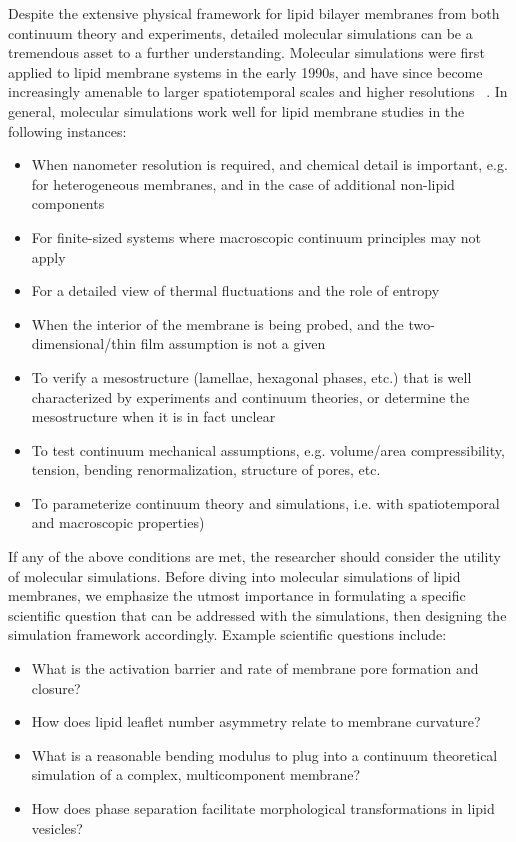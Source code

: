 \documentclass[9pt,bestpractices,pubversion]{livecoms}
\begin{document}
Despite the extensive physical framework for lipid bilayer membranes from both continuum theory and experiments, detailed molecular simulations can be a tremendous asset to a further understanding.
Molecular simulations were first applied to lipid membrane systems in the early 1990s, and have since become increasingly amenable to larger spatiotemporal scales and higher resolutions ~\cite{Venable2015}.
In general, molecular simulations work well for lipid membrane studies in the following instances:
\begin{itemize}
	\item When nanometer resolution is required, and chemical detail is important, e.g. for heterogeneous membranes, and in the case of additional non-lipid components
	\item For finite-sized systems where macroscopic continuum principles may not apply
	\item For a detailed view of thermal fluctuations and the role of entropy
	\item When the interior of the membrane is being probed, and the two-dimensional/thin film assumption is not a given
	\item To verify a mesostructure (lamellae, hexagonal phases, etc.) that is well characterized by experiments and continuum theories, or determine the mesostructure when it is in fact unclear
	\item To test continuum mechanical assumptions, e.g. volume/area compressibility, tension, bending renormalization, structure of pores, etc.
	\item To parameterize continuum theory and simulations, i.e. with spatiotemporal and macroscopic properties)
\end{itemize}

If any of the above conditions are met, the researcher should consider the utility of molecular simulations.
Before diving into molecular simulations of lipid membranes, we emphasize the utmost importance in formulating a specific scientific question that can be addressed with the simulations, then designing the simulation framework accordingly.
Example scientific questions include:

\begin{itemize}
	\item What is the activation barrier and rate of membrane pore formation and closure?
	\item How does lipid leaflet number asymmetry relate to membrane curvature?
	\item What is a reasonable bending modulus to plug into a continuum theoretical simulation of a complex, multicomponent membrane?
	\item How does phase separation facilitate morphological transformations in lipid vesicles?
\end{itemize}
\end{document}
